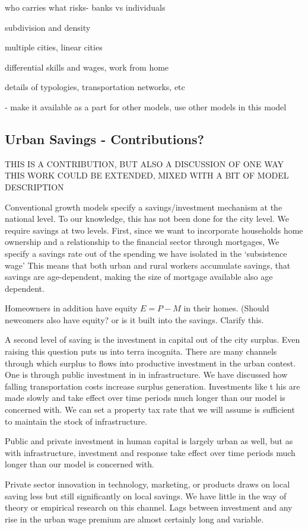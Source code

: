 who carries what risks- banks vs individuals

subdivision and density

multiple cities,
linear cities

differential skills and wages,
work from home

details of typologies, transportation networks, etc

- make it available as a part for other models, use other models in this model

\subsection{Urban Savings - Contributions?}
THIS IS A CONTRIBUTION, BUT ALSO A DISCUSSION OF ONE WAY THIS WORK COULD BE EXTENDED, MIXED WITH A BIT OF MODEL DESCRIPTION

Conventional growth models specify a savings/investment mechanism at the national level. To our knowledge, this has not been done for the city level. We require  savings at two levels. First, since we want to incorporate  households home ownership and a relationship to the financial sector through mortgages, We specify a savings rate out of the spending we have isolated in the `subsistence wage' This means that both urban and rural workers accumulate savings, that savings are age-dependent, making the size of mortgage available also age dependent. 

Homeowners in addition have equity $E=P-M$ in their homes.  ({\color{red}Should newcomers also have equity? or is it built into the savings. Clarify this.} 

A second level of saving is the  investment in capital out of the city surplus. Even raising this question puts us into terra incognita. There are many  channels through which surplus to flows into productive investment in the urban contest. One is through public investment in in infrastructure. We have discussed how falling transportation costs increase surplus generation. Investments like t his are made slowly and take effect over time periods much longer than our model is concerned with.  We can set a property tax rate   that we will assume is sufficient to maintain the stock of infrastructure.

Public and private investment in human capital is largely urban as well, but as with infrastructure, investment and response take effect over time periods much longer than our model is concerned with. 

Private sector innovation in technology, marketing, or products draws on local saving less but still significantly on local savings. We have little in the way of theory or empirical research on this channel. Lags between investment and any rise in the urban wage premium are almost certainly long and variable. 

